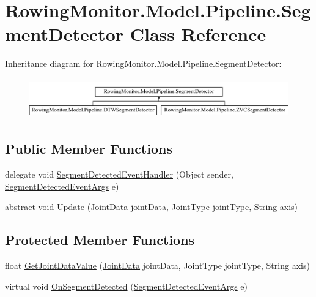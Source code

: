 \hypertarget{class_rowing_monitor_1_1_model_1_1_pipeline_1_1_segment_detector}{}\section{Rowing\+Monitor.\+Model.\+Pipeline.\+Segment\+Detector Class Reference}
\label{class_rowing_monitor_1_1_model_1_1_pipeline_1_1_segment_detector}
Inheritance diagram for Rowing\+Monitor.\+Model.\+Pipeline.\+Segment\+Detector\+:\begin{figure}[H]
\begin{center}
\leavevmode
\includegraphics[height=1.755486cm]{class_rowing_monitor_1_1_model_1_1_pipeline_1_1_segment_detector}
\end{center}
\end{figure}
\subsection*{Public Member Functions}
\begin{DoxyCompactItemize}
\item 
delegate void \hyperlink{class_rowing_monitor_1_1_model_1_1_pipeline_1_1_segment_detector_aee5283f7fa49f68c5c4195449442093c}{Segment\+Detected\+Event\+Handler} (Object sender, \hyperlink{class_rowing_monitor_1_1_model_1_1_segment_detected_event_args}{Segment\+Detected\+Event\+Args} e)
\item 
abstract void \hyperlink{class_rowing_monitor_1_1_model_1_1_pipeline_1_1_segment_detector_a24dcb2926660a6218af3052f147d82da}{Update} (\hyperlink{struct_rowing_monitor_1_1_model_1_1_util_1_1_joint_data}{Joint\+Data} joint\+Data, Joint\+Type joint\+Type, String axis)
\end{DoxyCompactItemize}
\subsection*{Protected Member Functions}
\begin{DoxyCompactItemize}
\item 
float \hyperlink{class_rowing_monitor_1_1_model_1_1_pipeline_1_1_segment_detector_a1f8ffebdfca18aa67a213ca817981161}{Get\+Joint\+Data\+Value} (\hyperlink{struct_rowing_monitor_1_1_model_1_1_util_1_1_joint_data}{Joint\+Data} joint\+Data, Joint\+Type joint\+Type, String axis)
\item 
virtual void \hyperlink{class_rowing_monitor_1_1_model_1_1_pipeline_1_1_segment_detector_a30d5b8752257a3992db11770506f6a8a}{On\+Segment\+Detected} (\hyperlink{class_rowing_monitor_1_1_model_1_1_segment_detected_event_args}{Segment\+Detected\+Event\+Args} e)
\end{DoxyCompactItemize}
